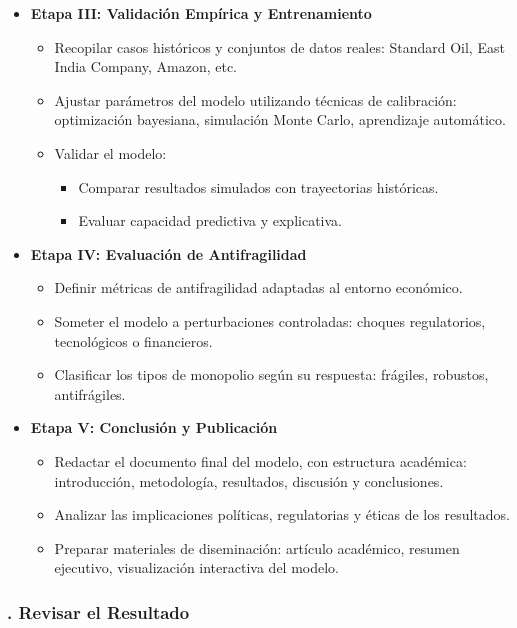 \documentclass[a4paper,12pt]{article}
\begin{document}
\begin{itemize}
\item \textbf{Etapa III: Validación Empírica y Entrenamiento} 
	\begin{itemize}
    \item Recopilar casos históricos y conjuntos de datos reales: Standard Oil, East India Company, Amazon, etc.
    \item Ajustar parámetros del modelo utilizando técnicas de calibración: optimización bayesiana, simulación Monte Carlo, aprendizaje automático.
    \item Validar el modelo:
    	\begin{itemize}
        \item Comparar resultados simulados con trayectorias históricas.
        \item Evaluar capacidad predictiva y explicativa.
    	\end{itemize}
	\end{itemize}
	
\item \textbf{Etapa IV: Evaluación de Antifragilidad} 
	\begin{itemize}
    \item Definir métricas de antifragilidad adaptadas al entorno económico.
    \item Someter el modelo a perturbaciones controladas: choques regulatorios, tecnológicos o financieros.
    \item Clasificar los tipos de monopolio según su respuesta: frágiles, robustos, antifrágiles.
	\end{itemize}
\item \textbf{Etapa V: Conclusión y Publicación} 
	\begin{itemize}
    \item Redactar el documento final del modelo, con estructura académica: introducción, metodología, resultados, discusión y conclusiones.
    \item Analizar las implicaciones políticas, regulatorias y éticas de los resultados.
    \item Preparar materiales de diseminación: artículo académico, resumen ejecutivo, visualización interactiva del modelo.
	\end{itemize}

    
\end{itemize}



\subsubsection*{. Revisar el Resultado}
\end{document}
